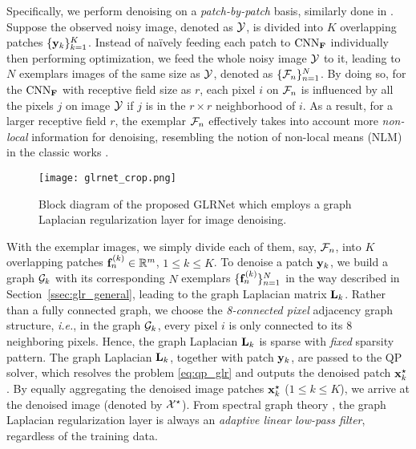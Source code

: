 \documentclass[10pt,twocolumn,letterpaper]{article}
\begin{document}
Specifically, we perform denoising on a \emph{patch-by-patch} basis, similarly done in \cite{pang2017graph,hu2016graph,liu2014progressive}. 
Suppose the observed noisy image, denoted as ${\cal Y}$, is divided into $K$ overlapping patches $\{{\bf y}_k\}_{k=1}^K$.
Instead of na\"{i}vely feeding each patch to $\rm{CNN}_{\bf F}$ individually then performing optimization, we feed the whole noisy image ${\cal Y}$ to it, leading to $N$ exemplars images of the same size as ${\cal Y}$, denoted as $\{{\cal F}_n\}_{n=1}^N$. 
By doing so, for the $\rm{CNN}_{\bf F}$ with receptive field size as $r$, each pixel $i$ on ${\cal F}_n$ is influenced by all the pixels $j$ on image ${\cal Y}$ if $j$ is in the $r\times r$ neighborhood of $i$. 
As a result, for a larger receptive field $r$, the exemplar ${\cal F}_n$ effectively takes into account more \emph{non-local} information for denoising, resembling the notion of non-local means (NLM) in the classic works \cite{buades2005non,dabov2007image}. 

\begin{figure*}[t]
\centering
    \texttt{[image: glrnet\_crop.png]}
\caption{Block diagram of the proposed GLRNet which employs a graph Laplacian regularization layer for image denoising.}
\label{fig:glrnet}
\end{figure*}
%
With the exemplar images, we simply divide each of them, say, ${\cal F}_n$, into $K$ overlapping patches ${\bf f}_n^{(k)}\in\mathbb{R}^m$, $1\le k\le K$. 
To denoise a patch ${\bf y}_k$, we build a graph ${\cal G}_k$ with its corresponding $N$ exemplars $\{{\bf f}_n^{(k)}\}_{n=1}^N$ in the way described in Section~\ref{ssec:glr_general}, leading to the graph Laplacian matrix ${\bf L}_k$. 
Rather than a fully connected graph, we choose the \emph{8-connected pixel} adjacency graph structure, {\it i.e.}, in the graph ${\cal G}_k$, every pixel $i$ is only connected to its 8 neighboring pixels. 
Hence, the graph Laplacian ${\bf L}_k$ is sparse with \emph{fixed} sparsity pattern.
The graph Laplacian ${\bf L}_k$, together with patch ${\bf y}_k$, are passed to the QP solver, which resolves the problem \eqref{eq:qp_glr} and outputs the denoised patch ${\bf x}_k^{\star}$.
By equally aggregating the denoised image patches ${\bf x}_k^{\star}$ ($1\le k\le K$), we arrive at the denoised image (denoted by ${\cal X}^{\star}$).
From spectral graph theory \cite{chung1997spectral}, the graph Laplacian regularization layer is always an \emph{adaptive linear low-pass filter}, regardless of the training data.
\end{document}
